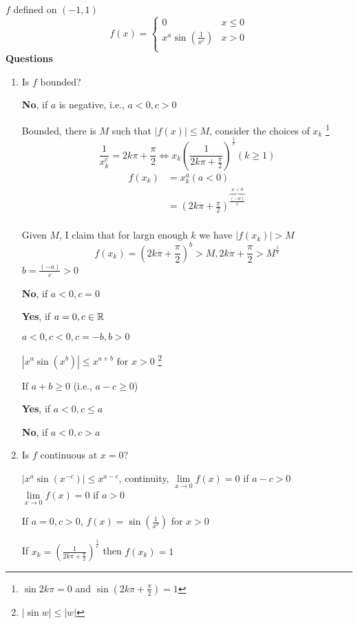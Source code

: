 \begin{example*}
  $f$ defined on $(-1, 1)$
  \[ f(x) = \begin{cases}
    0 & x\le 0 \\
    x^a\sin\left(\frac{1}{x^c}\right) &  x > 0 \\
  \end{cases}
  \]
  \textbf{Questions}
  \begin{enumerate}
    \item Is $f$ bounded?

    \textbf{No}, if $a$ is negative, i.e., $a < 0, c > 0$

    Bounded, there is $M$ such that $|f(x)| \le M$,
    consider the choices of $x_k$
    \footnote{$\sin 2k\pi = 0$ and $\sin\left(2k\pi + \frac{\pi}{2}\right) = 1$}
    \[\frac{1}{x_k^c} = 2k\pi + \frac{\pi}{2} \iff x_k\left(\frac{1}{2k\pi + \frac{\pi}{2}}\right)^{\frac{1}{c}} (k \ge 1)\]
    \begin{align*}
    f(x_k) &= x_k^a (a < 0) \\ 
      &= (2k\pi + \frac{\pi}{2})^{\overbrace{\frac{(-a)}{c}}^{a < 0}} \\
    \end{align*}

    Given $M$, I claim that for largn enough $k$ we have $|f(x_k)| > M$
    \[ f(x_k) =\left(2k\pi + \frac{\pi}{2}\right)^b > M, 2k\pi + \frac{\pi}{2} > M^{\frac{1}{b}}\]
    $b = \frac{(-a)}{c} > 0$

    \textbf{No}, if $a < 0, c = 0$

    \textbf{Yes}, if $a = 0, c \in \mathbb R$

    $a < 0, c < 0, c = -b, b > 0$

    $|x^a \sin(x^b)| \le x^{a + b}\text{ for } x > 0$ \footnote{$|\sin w| \le |w|$}

    If $a + b \ge 0$ (i.e., $a - c \ge 0$)

    \textbf{Yes}, if $a < 0, c \le a$

    \textbf{No}, if $a < 0, c > a$
    \item Is $f$ continuous at $x = 0$?

    $|x^a \sin(x^{-c})| \le x ^ {a - c}$, continuity, $\lim\limits_{x \to 0} f(x) = 0$ if $a - c > 0$
    $\lim\limits_{x \to 0} f(x) = 0$ if $a > 0$

    If $a = 0, c > 0$, $f(x) = \sin\left(\frac{1}{x^c}\right)$ for $x > 0$ 

    If $x_k = \left(\frac{1}{2k\pi + \frac{\pi}{2}}\right)^{\frac{1}{c}}$ then $f(x_k) = 1$


\end{enumerate}
\end{example*}

